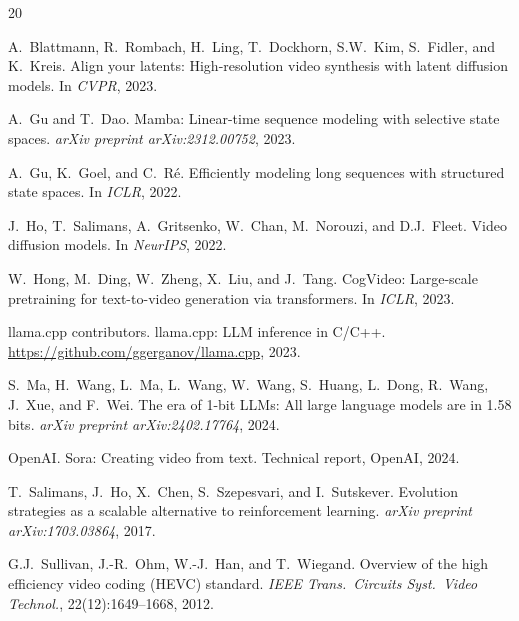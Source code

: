 \documentclass[11pt]{article}
\begin{document}
\begin{thebibliography}{20}

A.~Blattmann, R.~Rombach, H.~Ling, T.~Dockhorn, S.W.~Kim, S.~Fidler, and K.~Kreis.
\newblock Align your latents: High-resolution video synthesis with latent diffusion models.
\newblock In \emph{CVPR}, 2023.

A.~Gu and T.~Dao.
\newblock Mamba: Linear-time sequence modeling with selective state spaces.
\newblock \emph{arXiv preprint arXiv:2312.00752}, 2023.

A.~Gu, K.~Goel, and C.~R{\'e}.
\newblock Efficiently modeling long sequences with structured state spaces.
\newblock In \emph{ICLR}, 2022.

J.~Ho, T.~Salimans, A.~Gritsenko, W.~Chan, M.~Norouzi, and D.J.~Fleet.
\newblock Video diffusion models.
\newblock In \emph{NeurIPS}, 2022.

W.~Hong, M.~Ding, W.~Zheng, X.~Liu, and J.~Tang.
\newblock CogVideo: Large-scale pretraining for text-to-video generation via transformers.
\newblock In \emph{ICLR}, 2023.

{llama.cpp contributors}.
\newblock llama.cpp: LLM inference in C/C++.
\newblock \url{https://github.com/ggerganov/llama.cpp}, 2023.

S.~Ma, H.~Wang, L.~Ma, L.~Wang, W.~Wang, S.~Huang, L.~Dong, R.~Wang, J.~Xue, and F.~Wei.
\newblock The era of 1-bit {LLM}s: All large language models are in 1.58 bits.
\newblock \emph{arXiv preprint arXiv:2402.17764}, 2024.

{OpenAI}.
\newblock Sora: Creating video from text.
\newblock Technical report, OpenAI, 2024.

T.~Salimans, J.~Ho, X.~Chen, S.~Szepesvari, and I.~Sutskever.
\newblock Evolution strategies as a scalable alternative to reinforcement learning.
\newblock \emph{arXiv preprint arXiv:1703.03864}, 2017.

G.J.~Sullivan, J.-R.~Ohm, W.-J.~Han, and T.~Wiegand.
\newblock Overview of the high efficiency video coding ({HEVC}) standard.
\newblock \emph{IEEE Trans.\ Circuits Syst.\ Video Technol.}, 22(12):1649--1668, 2012.


\end{thebibliography}
\end{document}
